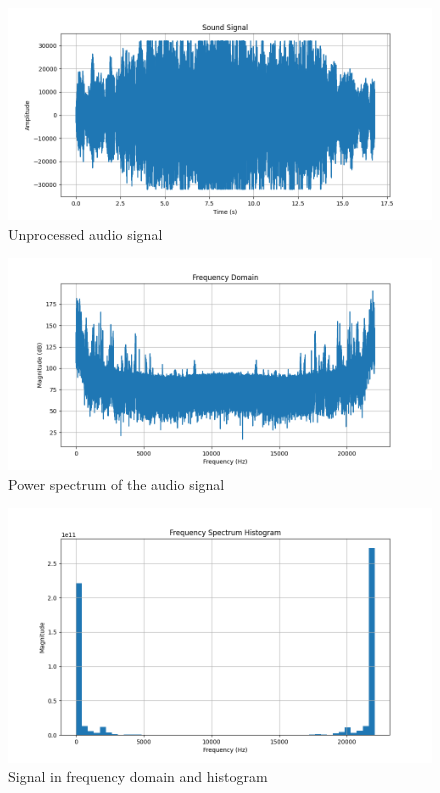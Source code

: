 \documentclass[a4paper,12pt,fleqn]{article}
\begin{document}
\begin{figure}[H]
    \centering
    \includegraphics[width=1\textwidth]{ex2_raw.png}
    \caption{Unprocessed audio signal}
    \label{fig:ex2}
\end{figure}
\begin{figure}[H]
    \centering
    \includegraphics[width=1\textwidth]{ex2_frequency_domain.png}
    \caption{Power spectrum of the audio signal}
    \label{fig:ex2_freq}
    
\end{figure}
\begin{figure}[H]
    \centering
    \includegraphics[width=1\textwidth]{ex2_spectrum_histogram.png}
    \caption{Signal in frequency domain and histogram}
    \label{fig:ex2_hist}
\end{figure}
\end{document}
